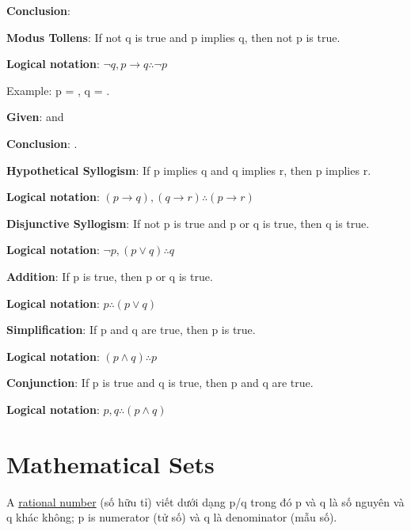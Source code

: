 \textbf{Conclusion}: 

\vspace{10mm}

\textbf{Modus Tollens}: If not q is true and p implies q, then not p is true.

\textbf{Logical notation}: \(\neg q, p \rightarrow q \therefore \neg p\)

Example: p = , q = .

\textbf{Given}:  and 

\textbf{Conclusion}: .

\vspace{10 mm}

\textbf{Hypothetical Syllogism}: If p implies q and q implies r, then p implies r.

\textbf{Logical notation}: \((p \rightarrow q), (q \rightarrow r) \therefore (p \rightarrow r)\)

\vspace{10 mm}

\textbf{Disjunctive Syllogism}: If not p is true and p or q is true, then q is true.

\textbf{Logical notation}: \(\neg p, (p \vee q) \therefore q\)

\vspace{10 mm}

\textbf{Addition}: If p is true, then p or q is true.

\textbf{Logical notation}: \(p \therefore (p \vee q)\)

\vspace{10 mm}

\textbf{Simplification}: If p and q are true, then p is true.

\textbf{Logical notation}: \((p \wedge q) \therefore p\)

\vspace{10 mm}

\textbf{Conjunction}: If p is true and q is true, then p and q are true.

\textbf{Logical notation}: \(p,q \therefore (p \wedge q)\)

\section{Mathematical Sets}

A \href{https://en.wikipedia.org/wiki/Rational_number}{rational number} (số hữu tỉ) viết dưới dạng p/q trong đó p và q là số nguyên và q khác không; p is numerator (tử số) và q là denominator (mẫu số).

